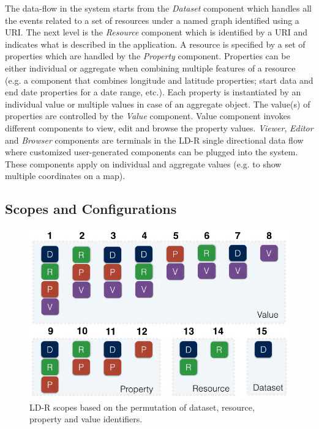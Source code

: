 \documentclass{acm_proc_article-sp}
\begin{document}
The data-flow in the system starts from the \emph{Dataset} component which handles all the events related to a set of resources under a named graph identified using a URI.
The next level is the \emph{Resource} component which is identified by a URI and indicates what is described in the application.
A resource is specified by a set of properties which are handled by the \emph{Property} component. 
Properties can be either individual or aggregate when combining multiple features of a resource (e.g. a component that combines longitude and latitude properties; start data and end date properties for a date range, etc.).
Each property is instantiated by an individual value or multiple values in case of an aggregate object. 
The value(s) of properties are controlled by the \emph{Value} component.
Value component invokes different components to view, edit and browse the property values.
\emph{Viewer}, \emph{Editor} and \emph{Browser} components are terminals in the LD-R single directional data flow where customized user-generated components can be plugged into the system.
These components apply on individual and aggregate values (e.g. to show multiple coordinates on a map).

\subsection{Scopes and Configurations}

\begin{figure}[tb]
  \includegraphics[width=.9\linewidth]{images/scopes.jpg}
  \caption{LD-R scopes based on the permutation of dataset, resource, property and value identifiers.}
  \label{fig:scopes}
\end{figure}
\end{document}
